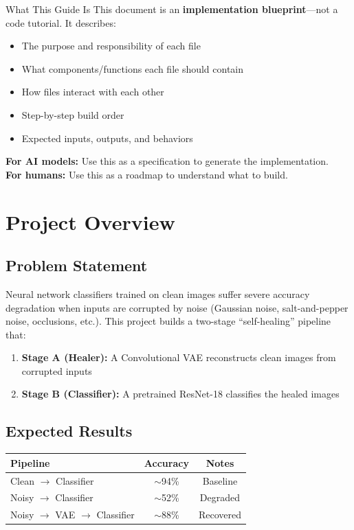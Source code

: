 \documentclass[11pt,a4paper]{article}
\begin{document}
\begin{conceptbox}{What This Guide Is}
This document is an \textbf{implementation blueprint}---not a code tutorial. It describes:
\begin{itemize}[noitemsep]
    \item The purpose and responsibility of each file
    \item What components/functions each file should contain
    \item How files interact with each other
    \item Step-by-step build order
    \item Expected inputs, outputs, and behaviors
\end{itemize}
\textbf{For AI models:} Use this as a specification to generate the implementation.\\
\textbf{For humans:} Use this as a roadmap to understand what to build.
\end{conceptbox}

\tableofcontents
\newpage


\section{Project Overview}

\subsection{Problem Statement}
Neural network classifiers trained on clean images suffer severe accuracy degradation when inputs are corrupted by noise (Gaussian noise, salt-and-pepper noise, occlusions, etc.). This project builds a two-stage ``self-healing'' pipeline that:
\begin{enumerate}[noitemsep]
    \item \textbf{Stage A (Healer):} A Convolutional VAE reconstructs clean images from corrupted inputs
    \item \textbf{Stage B (Classifier):} A pretrained ResNet-18 classifies the healed images
\end{enumerate}

\subsection{Expected Results}
\begin{center}
\begin{tabular}{@{}lcc@{}}
\toprule
\textbf{Pipeline} & \textbf{Accuracy} & \textbf{Notes} \\
\midrule
Clean $\rightarrow$ Classifier & $\sim$94\% & Baseline \\
Noisy $\rightarrow$ Classifier & $\sim$52\% & Degraded \\
Noisy $\rightarrow$ VAE $\rightarrow$ Classifier & $\sim$88\% & Recovered \\
\bottomrule
\end{tabular}
\end{center}
\end{document}
